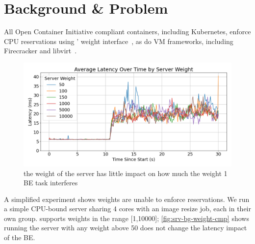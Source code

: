 
\section{Background \& Problem}

All Open Container Initiative compliant containers, including Kubernetes,
enforce CPU reservations using \cgroups{}' weight interface~\cite{oci-cgroups,
docker-docs-cgroups, container-isolation-article}, as do VM frameworks,
including Firecracker and
libvirt~\cite{firecracker-cgroups,afaas,libvirt-cgroups}. 

\begin{figure}[t]
    \centering
    \includegraphics[width=\columnwidth]{graphs/srv-bg-weight-cmp-low.png}
    \caption{ the weight of the server has little impact on how much the
    weight 1 BE task interferes }\label{fig:srv-bg-weight-cmp}
\end{figure}


A simplified experiment shows \cgroups{} weights are unable to enforce
reservations. We run a simple CPU-bound server sharing 4 cores with an image
resize job, each in their own group. \cgroups{} supports weights in the range
[1,10000]; \autoref{fig:srv-bg-weight-cmp} shows running the server with any
weight above 50 does not change the latency impact of the BE.

